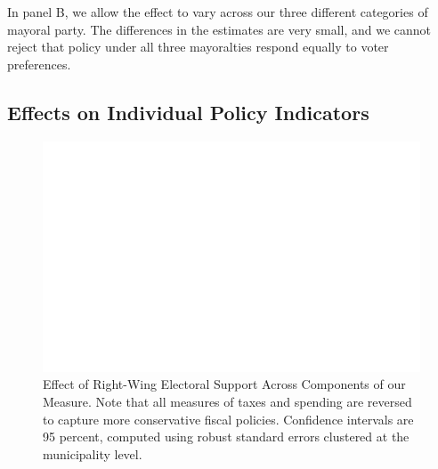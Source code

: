 \documentclass[a4paper,12pt]{article}
\begin{document}
In panel B, we allow the effect to vary across our three different categories of mayoral party. The differences in the estimates are very small, and we cannot reject that policy under all three mayoralties respond equally to voter preferences.

\clearpage

\subsection{Effects on Individual Policy Indicators}

\begin{figure}[!htb]
	\centering
	\includegraphics[scale = 1]{ItemByItem_18092018.eps}
	\caption{Effect of Right-Wing Electoral Support Across Components of our Measure. Note that all measures of taxes and spending are reversed to capture more conservative fiscal policies. Confidence intervals are 95 percent, computed using robust standard errors clustered at the municipality level.} \label{fig:item}
\end{figure}
\clearpage

%
%
\end{document}
